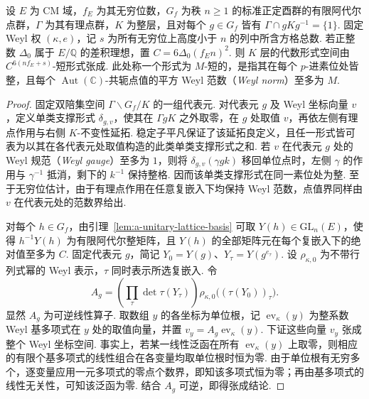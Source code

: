 \begin{lemma}[无挠层上的短整形式]
\label{lem:a-free-level-short-forms}
\emitthmsource
设 $E$ 为 CM 域，$f_E$ 为其无穷位数，$G_f$ 为秩 $n\ge1$ 的标准正定酉群的有限阿代尔点群，$\Gamma$ 为其有理点群，$K$ 为整层，且对每个 $g\in G_f$ 皆有 $\Gamma\cap gKg^{-1}=\{1\}$. 固定 Weyl 权 $(\kappa,e)$，记 $s$ 为所有无穷位上高度小于 $n$ 的列中所含方格总数. 若正整数 $\Delta_0$ 属于 $E/\mathbb Q$ 的差积理想，置 $C=6\Delta_0(f_E n)^2$. 则 $K$ 层的代数形式空间由 $C^{6(nf_E+s)}$-短形式张成. 此处称一个形式为 $M$-短的，是指其在每个 $p$-进素位处皆整，且每个 $\operatorname{Aut}(\mathbb C)$-共轭点值的平方 Weyl 范数（\emph{Weyl norm}）至多为 $M$.
\end{lemma}
\begin{proof}
固定双陪集空间 $\Gamma\backslash G_f/K$ 的一组代表元. 对代表元 $g$ 及 Weyl 坐标向量 $v$，定义单类支撑形式 $\delta_{g,v}$，使其在 $\Gamma gK$ 之外取零，在 $g$ 处取值 $v$，再依左侧有理点作用与右侧 $K$-不变性延拓. 稳定子平凡保证了该延拓良定义，且任一形式皆可表为以其在各代表元处取值构造的此类单类支撑形式之和. 若 $v$ 在代表元 $g$ 处的 Weyl 规范（\emph{Weyl gauge}）至多为 $1$，则将 $\delta_{g,v}(\gamma gk)$ 移回单位点时，左侧 $\gamma$ 的作用与 $\gamma^{-1}$ 抵消，剩下的 $k^{-1}$ 保持整格. 因而该单类支撑形式在同一素位处为整. 至于无穷位估计，由于有理点作用在任意复嵌入下均保持 Weyl 范数，点值界同样由 $v$ 在代表元处的范数界给出.

对每个 $h\in G_f$，由引理~\ref{lem:a-unitary-lattice-basis} 可取 $Y(h)\in\mathrm{GL}_n(E)$，使得 $h^{-1}Y(h)$ 为有限阿代尔整矩阵，且 $Y(h)$ 的全部矩阵元在每个复嵌入下的绝对值至多为 $C$. 固定代表元 $g$，简记 $Y_0=Y(g)$、$Y_\tau=Y(g^{e_\tau})$. 设 $\rho_{\kappa,0}$ 为不带行列式幂的 Weyl 表示，$\tau$ 同时表示所选复嵌入. 令
\[
 A_g=\left(\prod_\tau\det\tau(Y_\tau)\right)
      \rho_{\kappa,0}\bigl((\tau(Y_0))_\tau\bigr).
\]
显然 $A_g$ 为可逆线性算子. 取数组 $y$ 的各坐标为单位根，记 $\operatorname{ev}_\kappa(y)$ 为整系数 Weyl 基多项式在 $y$ 处的取值向量，并置 $v_y=A_g\operatorname{ev}_\kappa(y)$. 下证这些向量 $v_y$ 张成整个 Weyl 坐标空间. 事实上，若某一线性泛函在所有 $\operatorname{ev}_\kappa(y)$ 上取零，则相应的有限个基多项式的线性组合在各变量均取单位根时恒为零. 由于单位根有无穷多个，逐变量应用一元多项式的零点个数界，即知该多项式恒为零；再由基多项式的线性无关性，可知该泛函为零. 结合 $A_g$ 可逆，即得张成结论.


\end{proof}
